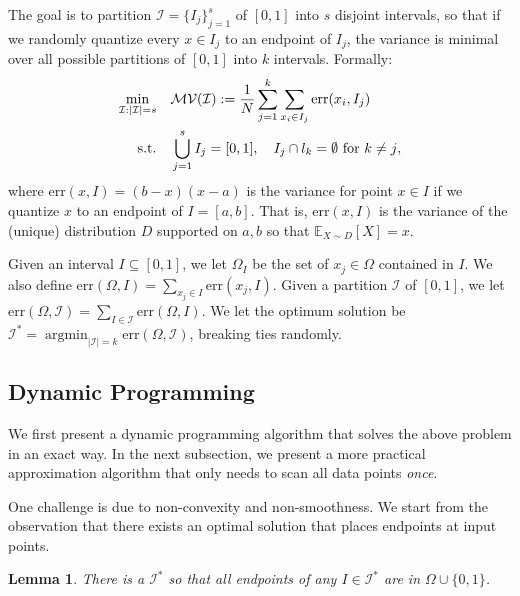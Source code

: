 \documentclass{article}
\def\E{\mathbb{E}}
\newcommand{\err}{\ensuremath{\mathrm{err}}}
\newcommand{\setX}{\Omega}
\newcommand{\setI}{\mathcal{I}}
\DeclareMathOperator*{\argmin}{argmin}
\newtheorem{lemma}{Lemma}
\begin{document}
The goal is to partition $\setI = \{I_j\}_{j = 1}^s$ of $[0, 1]$ into $s$ disjoint intervals, so that if we randomly quantize every $x \in I_j$ to an endpoint of $I_j$, the variance is minimal over all possible partitions of $[0, 1]$ into $k$ intervals.
Formally:
\vspace{-0.5em}
\begin{align}
\nonumber \min_{\setI: |\setI| = s} \quad & \mathcal{MV}(\setI) := {1\over N}\sum_{j = 1}^k \sum_{x_i \in I_j} \err(x_i, I_j)\\
\text{s.t.}\quad & \bigcup_{j = 1}^s I_j = [0, 1],\quad I_j\cap l_k = \emptyset~\text{for $k\neq j$},
\label{eq:opt_Q}
\end{align}
where $\err (x, I) = (b - x) (x - a)$ is the variance for point $x \in I$ if we quantize $x$ to an endpoint of $I = [a, b]$.
That is, $\err (x, I)$ is the variance of the (unique) distribution $D$ supported on ${a, b}$ so that $\E_{X \sim D} [X] = x$.

Given an interval $I \subseteq [0, 1]$, we let $\setX_I$ be the set of $x_j \in \setX$ contained in $I$.
We also define $\err (\setX, I) = \sum_{x_j \in I} \err (x_j, I)$.
Given a partition $\setI$ of $[0, 1]$, we let $\err (\setX, \setI) = \sum_{I \in \setI} \err (\setX, I)$.
We let the optimum solution be $\setI^* = \argmin_{|\setI| = k} \err (\setX, \setI)$, breaking ties randomly. 

\vspace{-1em}
\subsection{Dynamic Programming}
\vspace{-0.5em}

We first present a dynamic programming algorithm that solves the above problem in an exact way. In the next subsection, we present a more practical approximation algorithm that only needs to scan all data points \emph{once}.

\vspace{-0.5em}
One challenge is due to non-convexity and non-smoothness. 
We start from the observation that there exists an optimal solution that places endpoints at input points. 

\begin{lemma}
\label{lem:discrete}
There is a $\setI^*$ so that all endpoints of any $I \in \setI^*$ are in $\Omega \cup \{0, 1\}$.
\end{lemma}
\end{document}
